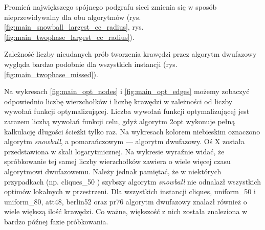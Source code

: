 Promień największego spójnego podgrafu sieci zmienia się w sposób nieprzewidywalny dla obu algorytmów (rys. \ref{fig:main_snowball_largest_cc_radius}, rys. \ref{fig:main_twophase_largest_cc_radius}).

Zależność liczby nieudanych prób tworzenia krawędzi przez algorytm dwufazowy wygląda bardzo podobnie dla wszystkich instancji (rys. \ref{fig:main_twophase_missed}).

Na wykresach \ref{fig:main_opt_nodes} i \ref{fig:main_opt_edges} możemy zobaczyć odpowiednio liczbę wierzchołków i liczbę krawędzi
w zależności od liczby wywołań funkcji optymalizującej. Liczba wywołań funkcji optymalizującej jest zarazem liczbą wywołań funkcji celu, gdyż
algorytm 2opt wykonuje pełną kalkulację długości ścieżki tylko raz.
Na wykresach kolorem niebieskim oznaczono algorytm \textit{snowball}, a pomarańczowym --- algorytm dwufazowy.
Oś X została przedstawiona w skali logarytmicznej.
Na wykresie wyraźnie widać, że spróbkowanie tej samej liczby wierzchołków zawiera o wiele więcej czasu algorytmowi dwufazowemu.
Należy jednak pamiętać, że w niektórych przypadkach (np. cliques\_50 ) szybszy algorytm \textit{snowball} nie odnalazł wszystkich optimów lokalnych w przestrzeni.
Dla wszystkich instancji cliques, uniform\_50 i uniform\_80, att48, berlin52 oraz pr76 algorytm dwufazowy znalazł również o wiele większą ilość krawędzi.
Co ważne, większość z nich została znaleziona w bardzo późnej fazie próbkowania.

